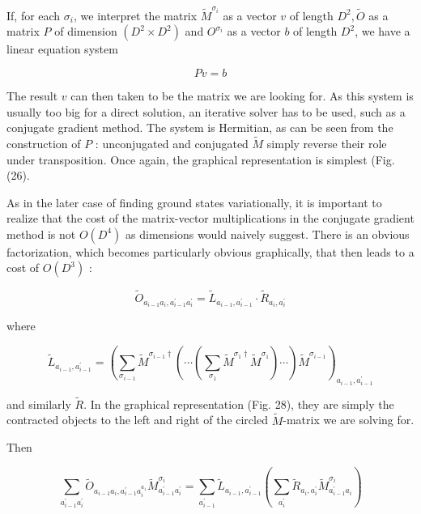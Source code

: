 \documentclass[12pt]{article}
\begin{document}
If, for each $\sigma_{i}$, we interpret the matrix $\tilde{M}^{\sigma_{i}}$ as a vector $v$ of length $D^{2}, \tilde{O}$ as a matrix $P$ of dimension $\left(D^{2} \times D^{2}\right)$ and $O^{\sigma_{i}}$ as a vector $b$ of length $D^{2}$, we have a linear equation system


\begin{equation*}
P v=b \tag{144}
\end{equation*}


The result $v$ can then taken to be the matrix we are looking for. As this system is usually too big for a direct solution, an iterative solver has to be used, such as a conjugate gradient method. The system is Hermitian, as can be seen from the construction of $P$ : unconjugated and conjugated $\tilde{M}$ simply reverse their role under transposition. Once again, the graphical representation is simplest (Fig. (26).

As in the later case of finding ground states variationally, it is important to realize that the cost of the matrix-vector multiplications in the conjugate gradient method is not $O\left(D^{4}\right)$ as dimensions would naively suggest. There is an obvious factorization, which becomes particularly obvious graphically, that then leads to a cost of $O\left(D^{3}\right)$ :


\begin{equation*}
\tilde{O}_{a_{i-1} a_{i}, a_{i-1}^{\prime} a_{i}^{\prime}}=\tilde{L}_{a_{i-1}, a_{i-1}^{\prime}} \cdot \tilde{R}_{a_{i}, a_{i}^{\prime}} \tag{145}
\end{equation*}


where


\begin{equation*}
\tilde{L}_{a_{i-1}, a_{i-1}^{\prime}}=\left(\sum_{\sigma_{i-1}} \tilde{M}^{\sigma_{i-1} \dagger}\left(\cdots\left(\sum_{\sigma_{1}} \tilde{M}^{\sigma_{1} \dagger} \tilde{M}^{\sigma_{1}}\right) \cdots\right) \tilde{M}^{\sigma_{i-1}}\right)_{a_{i-1}, a_{i-1}^{\prime}} \tag{146}
\end{equation*}


and similarly $\tilde{R}$. In the graphical representation (Fig. 28), they are simply the contracted objects to the left and right of the circled $\tilde{M}$-matrix we are solving for.

Then


\begin{equation*}
\sum_{a_{i-1}^{\prime} a_{i}^{\prime}} \tilde{O}_{a_{i-1} a_{i}, a_{i-1}^{\prime} a_{i}^{a_{1}}} \tilde{M}_{a_{i-1}^{\prime} a_{i}^{\prime}}^{\sigma_{i}}=\sum_{a_{i-1}^{\prime}} \tilde{L}_{a_{i-1}, a_{i-1}^{\prime}}\left(\sum_{a_{i}^{\prime}} \tilde{R}_{a_{i}, a_{i}^{\prime}} \tilde{M}_{a_{i-1}^{\prime} a_{i}}^{\sigma_{i}}\right) \tag{147}
\end{equation*}
\end{document}
